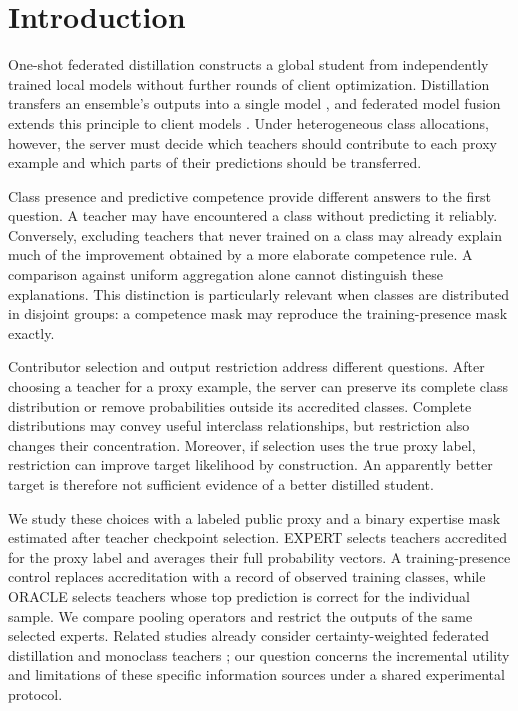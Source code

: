 \hypertarget{introduction}{%
\section{Introduction}\label{introduction}}

One-shot federated distillation constructs a global student from independently trained local models without further rounds of client optimization. Distillation transfers an ensemble's outputs into a single model \cite{hinton2015}, and federated model fusion extends this principle to client models \cite{li2019,lin2020}. Under heterogeneous class allocations, however, the server must decide which teachers should contribute to each proxy example and which parts of their predictions should be transferred.

Class presence and predictive competence provide different answers to the first question. A teacher may have encountered a class without predicting it reliably. Conversely, excluding teachers that never trained on a class may already explain much of the improvement obtained by a more elaborate competence rule. A comparison against uniform aggregation alone cannot distinguish these explanations. This distinction is particularly relevant when classes are distributed in disjoint groups: a competence mask may reproduce the training-presence mask exactly.

Contributor selection and output restriction address different questions. After choosing a teacher for a proxy example, the server can preserve its complete class distribution or remove probabilities outside its accredited classes. Complete distributions may convey useful interclass relationships, but restriction also changes their concentration. Moreover, if selection uses the true proxy label, restriction can improve target likelihood by construction. An apparently better target is therefore not sufficient evidence of a better distilled student.

We study these choices with a labeled public proxy and a binary expertise mask estimated after teacher checkpoint selection. EXPERT selects teachers accredited for the proxy label and averages their full probability vectors. A training-presence control replaces accreditation with a record of observed training classes, while ORACLE selects teachers whose top prediction is correct for the individual sample. We compare pooling operators and restrict the outputs of the same selected experts. Related studies already consider certainty-weighted federated distillation and monoclass teachers \cite{sattler2021,maron2025}; our question concerns the incremental utility and limitations of these specific information sources under a shared experimental protocol.


